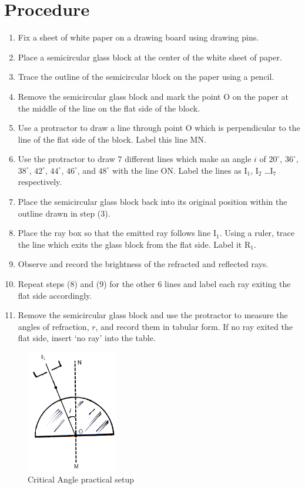 \section{Procedure}
\begin{enumerate}
\item Fix a sheet of white paper on a drawing board using drawing pins.
\item Place a semicircular glass block at the center of the white sheet of paper.
\item Trace the outline of the semicircular block on the paper using a pencil.
\item Remove the semicircular glass block and mark the point O on the paper at the middle of the line on the flat side of the block. 
\item Use a protractor to draw a line through point O which is perpendicular to the line of the flat side of the block.  Label this line MN.
\item Use the protractor to draw 7 different lines which make an angle $i$ of $20^\circ$, $36^\circ$, $38^\circ$, $42^\circ$, $44^\circ$, $46^\circ$, and $48^\circ$ with the line ON. Label the lines as I$_1$, I$_2$ \ldots I$_7$ respectively.
\item Place the semicircular glass block back into its original position within the outline drawn in step (3).
\item Place the ray box so that the emitted ray follows line I$_1$. Using a ruler, trace the line which exits the glass block from the flat side. Label it R$_1$. 
\item Observe and record the brightness of the refracted and reflected rays.
\item Repeat steps (8) and (9) for the other 6 lines and label each ray exiting the flat side accordingly.
\item Remove the semicircular glass block and use the protractor to measure the angles of refraction, $r$, and record them in tabular form. If no ray exited the flat side, insert ‘no ray’ into the table.
\end{enumerate}

\begin{figure}[h!]
\centering
\includegraphics[width=4cm]{./img/critical-angle-1}
\caption{Critical Angle practical setup}
\label{fig:critical-angle-1}
\end{figure}

